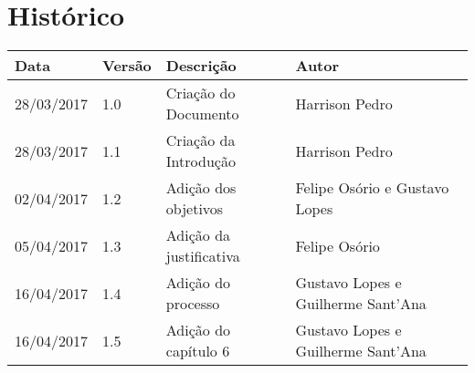 \chapter{Histórico}

\begin{tabular}{ |p{3cm}|p{3cm}|p{3cm}|p{3cm}|  }
 \hline
 Data 		& 		Versão & 		Descrição 			& 		Autor\\
 \hline\hline
 28/03/2017 & 		1.0    &		Criação do Documento &   	Harrison Pedro	  \\
 \hline
 28/03/2017 & 		1.1    &		Criação da Introdução &   	Harrison Pedro	  \\
 \hline
 02/04/2017 & 		1.2    &		Adição dos objetivos &   	Felipe Osório e Gustavo Lopes	  \\
 \hline
 05/04/2017 & 		1.3    &		Adição da justificativa &   Felipe Osório	  \\
 \hline
 16/04/2017 & 		1.4    &		Adição do processo &   Gustavo Lopes e Guilherme Sant'Ana	  \\
 \hline
 16/04/2017 & 		1.5    &		Adição do capítulo 6 &   Gustavo Lopes e Guilherme Sant'Ana	  \\
 \hline
\end{tabular}

